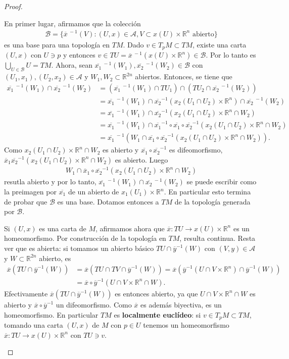 \documentclass[11pt]{article}
\newcommand{\R}{\mathbb{R}}
\newcommand{\ol}{\overline}
\begin{document}
\begin{proof}
\begin{itemize}
En primer lugar, afirmamos que la colecci\'on 
\begin{align*}
\mathcal{B} = \{\ol{x}^{\ -1}(V) : (U,x) \in \mathcal{A}, V \subset x(U) \times \R^n \text{ abierto}\}
\end{align*}
es una base para una topolog\'ia en $TM$. Dado $v \in T_pM \subset TM$, existe una carta $(U,x)$ con $U \ni p$ y entonces $v \in TU = \ol{x}^{\ -1}(x(U) \times \R^n) \in \mathcal{B}$. Por lo tanto es $\bigcup_{U \in\mathcal{B}}U = TM$. Ahora, sean $\ol{x_1}^{\ -1}(W_1),\ol{x_2}^{\ -1}(W_2) \in \mathcal{B}$ con $(U_1,x_1),(U_2,x_2) \in \mathcal{A}$ y $W_1,W_2 \subset \R^{2n}$ abiertos. Entonces, se tiene que
\begin{align*}
\ol{x_1}^{\ -1}(W_1) \cap \ol{x_2}^{\ -1}(W_2) & = (\ol{x_1}^{\ -1}(W_1) \cap TU_1) \cap (TU_2 \cap \ol{x_2}^{\ -1}(W_2))\\
& = \ol{x_1}^{\ -1}(W_1) \cap \ol{x_2}^{-1}(x_2(U_1 \cap U_2) \times \R^n) \cap \ol{x_2}^{\ -1}(W_2)\\
& = \ol{x_1}^{\ -1}(W_1) \cap \ol{x_2}^{-1}(x_2(U_1 \cap U_2) \times \R^n \cap W_2)\\
& = \ol{x_1}^{\ -1}(W_1) \cap \ol{x_1}^{-1} \circ  \ol{x_1} \circ \ol{x_2}^{-1}(x_2(U_1 \cap U_2) \times \R^n \cap W_2)\\
& = \ol{x_1}^{\ -1}(W_1 \cap \ol{x_1}\circ \ol{x_2}^{-1}(x_2(U_1 \cap U_2) \times \R^n \cap W_2)).
\end{align*}
Como $x_2(U_1 \cap U_2) \times \R^n \cap W_2$ es abierto y $\ol{x_1}\circ\ol{x_2}^{-1}$ es difeomorfismo, $\ol{x}_1\ol{x_2}^{-1}(x_2(U_1 \cap U_2) \times \R^n \cap W_2)$ es abierto. Luego
\begin{align*}
W_1 \cap \ol{x}_1\circ \ol{x_2}^{-1}(x_2(U_1 \cap U_2) \times \R^n \cap W_2)
\end{align*}
resutla abierto y por lo tanto, $\ol{x_1}^{\ -1}(W_1) \cap \ol{x_2}^{\ -1}(W_2)$ se puede escribir como la preimagen por $\ol{x_1}$ de un abierto de $x_1(U_1) \times \R^n$. En particular esto termina de probar que $\mathcal{B}$ es una base. Dotamos entonces a $TM$ de la topolog\'ia generada por $\mathcal{B}$.

Si $(U,x)$ es una carta de $M$, afirmamos ahora que $\ol{x} : TU \to x(U) \times \R^n$ es un homeomorfismo. Por construcci\'on de la topolog\'ia en $TM$, resulta continua. Resta ver que es abierta: si tomamos un abierto b\'asico $TU \cap \ol{y}^{-1}(W)$ con $(V,y) \in \mathcal{A}$ y $W \subset \R^{2n}$ abierto, es
\begin{align*}
\ol{x}(TU \cap \ol{y}^{-1}(W)) &= \ol{x}(TU \cap TV \cap \ol{y}^{-1}(W)) = \ol{x}(\ol{y}^{-1}(U \cap V \times \R^n) \cap \ol{y}^{-1}(W))\\
& = \ol{x} \circ \ol{y}^{-1}(U\cap V \times \R^n \cap W).
\end{align*}
Efectivamente $\ol{x}(TU \cap \ol{y}^{-1}(W))$ es entonces abierto, ya que $U\cap V \times \R^n \cap W$ es abierto y $\ol{x} \circ \ol{y}^{-1}$ un difeomorfismo. Como $\ol{x}$ es adem\'as biyectiva, es un homeomorfismo. En particular $TM$ es \textbf{localmente eucl\'ideo}: si $v \in T_pM  \subset TM$, tomando una carta $(U,x)$ de $M$ con $p \in U$ tenemos un homeomorfismo $\ol{x} : TU \to x(U) \times \R^{n}$ con $TU \ni v$.


\end{itemize}
\end{proof}
\end{document}
